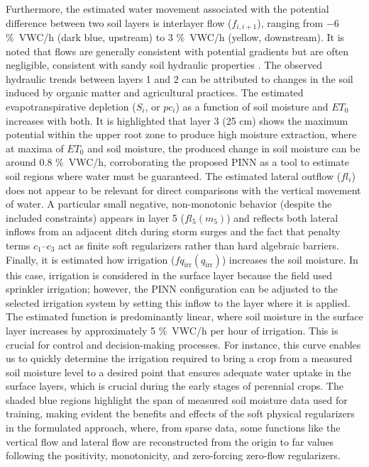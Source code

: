 \documentclass[pdflatex,sn-nature]{sn-jnl}%
\theoremstyle{thmstyleone}%
\theoremstyle{thmstyletwo}%
\theoremstyle{thmstylethree}%
\begin{document}
Furthermore, the estimated water movement associated with the potential difference between two soil layers is interlayer flow ($f_{i,i+1}$), ranging from $-6$ \si{\%VWC/h} (dark blue, upstream) to 3 \si{\%VWC/h} (yellow, downstream). It is noted that flows are generally consistent with potential gradients but are often negligible, consistent with sandy soil hydraulic properties \cite{Reyes2016}. The observed hydraulic trends between layers 1 and 2 can be attributed to changes in the soil induced by organic matter and agricultural practices.
The estimated evapotranspirative depletion ($S_i$, or $pc_i$) as a function of soil moisture and $ET_0$ increases with both. It is highlighted that layer 3 (25 \si{cm}) shows the maximum potential within the upper root zone to produce high moisture extraction, where at maxima of $ET_0$ and soil moisture, the produced change in soil moisture can be around 0.8 \si{\%VWC/h}, corroborating the proposed PINN as a tool to estimate soil regions where water must be guaranteed.
The estimated lateral outflow ($fl_i$) does not appear to be relevant for direct comparisons with the vertical movement of water. A particular small negative, non-monotonic behavior (despite the included constraints) appears in layer 5 ($fl_5(m_5)$) and reflects both lateral inflows from an adjacent ditch during storm surges and the fact that penalty terms $c_1$--$c_3$ act as finite soft regularizers rather than hard algebraic barriers.
Finally, it is estimated how irrigation ($fq_{\mathrm{irr}}(q_{\mathrm{irr}})$) increases the soil moisture. In this case, irrigation is considered in the surface layer because the field used sprinkler irrigation; however, the PINN configuration can be adjusted to the selected irrigation system by setting this inflow to the layer where it is applied. The estimated function is predominantly linear, where soil moisture in the surface layer increases by approximately 5 \si{\%VWC/h} per hour of irrigation. This is crucial for control and decision-making processes. For instance, this curve enables us to quickly determine the irrigation required to bring a crop from a measured soil moisture level to a desired point that ensures adequate water uptake in the surface layers, which is crucial during the early stages of perennial crops.
The shaded blue regions highlight the span of measured soil moisture data used for training, making evident the benefits and effects of the soft physical regularizers in the formulated approach, where, from sparse data, some functions like the vertical flow and lateral flow are reconstructed from the origin to far values following the positivity, monotonicity, and zero-forcing zero-flow regularizers.
\end{document}
